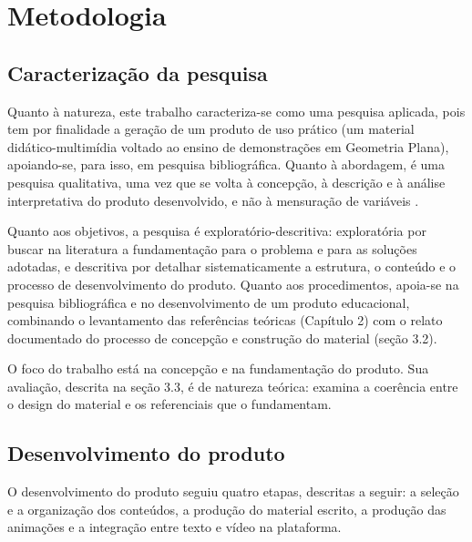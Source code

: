 
\chapter{Metodologia}\label{cap:metodologia}

\section{Caracterização da pesquisa}

Quanto à natureza, este trabalho caracteriza-se como uma pesquisa aplicada, pois tem por finalidade a geração de um produto de uso prático (um material didático-multimídia voltado ao ensino de demonstrações em Geometria Plana), apoiando-se, para isso, em pesquisa bibliográfica. Quanto à abordagem, é uma pesquisa qualitativa, uma vez que se volta à concepção, à descrição e à análise interpretativa do produto desenvolvido, e não à mensuração de variáveis \cite{gerhardt2009metodos,ludke1986pesquisa}.

Quanto aos objetivos, a pesquisa é exploratório-descritiva: exploratória por buscar na literatura a fundamentação para o problema e para as soluções adotadas, e descritiva por detalhar sistematicamente a estrutura, o conteúdo e o processo de desenvolvimento do produto. Quanto aos procedimentos, apoia-se na pesquisa bibliográfica e no desenvolvimento de um produto educacional, combinando o levantamento das referências teóricas (Capítulo 2) com o relato documentado do processo de concepção e construção do material (seção 3.2).

O foco do trabalho está na concepção e na fundamentação do produto. Sua avaliação, descrita na seção 3.3, é de natureza teórica: examina a coerência entre o design do material e os referenciais que o fundamentam.

\section{Desenvolvimento do produto}

O desenvolvimento do produto seguiu quatro etapas, descritas a seguir: a seleção e a organização dos conteúdos, a produção do material escrito, a produção das animações e a integração entre texto e vídeo na plataforma.

